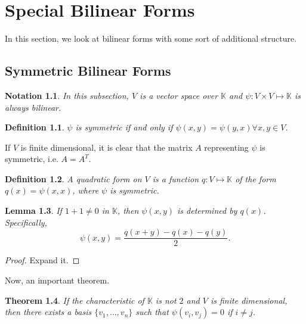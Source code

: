 \documentclass{notes}
\theoremstyle{plain}
\newtheorem{theorem}{Theorem}[chapter]
\newtheorem{definition}[theorem]{Definition}
\newtheorem{lemma}[theorem]{Lemma}
\newtheorem*{notation}{Notation}
\begin{document}
\chapter{Special Bilinear Forms}

In this section, we look at bilinear forms with some sort of
additional structure.

\section{Symmetric Bilinear Forms}

\begin{notation}
  In this subsection, $V$ is a vector space over $\mathbb{K}$ and
  $\psi : V \times V \mapsto \mathbb{K}$ is always bilinear.
\end{notation}

\begin{definition}
  $\psi$ is symmetric if and only if $\psi(x,y) = \psi(y,x) \forall
  x,y \in V$.
\end{definition}

If $V$ is finite dimensional, it is clear that the matrix $A$
representing $\psi$ is symmetric, i.e. $A=A^T$.

\begin{definition}
  A quadratic form on $V$ is a function $q : V \mapsto \mathbb{K}$ of
  the form $q(x)=\psi(x,x)$, where $\psi$ is symmetric.
\end{definition}

\begin{lemma}
  If $1+1 \ne 0$ in $\mathbb{K}$, then $\psi(x,y)$ is determined by
  $q(x)$.  Specifically,
\[
\psi(x,y) = \frac{q(x+y)-q(x)-q(y)}{2}.
\]
\end{lemma}

\begin{proof}
  Expand it.
\end{proof}

Now, an important theorem.

\begin{theorem}
  If the characteristic of $\mathbb{K}$ is not $2$ and $V$ is finite
  dimensional, then there exists a basis $\{v_1,\dots,v_n\}$ such that
  $\psi(v_i,v_j)=0$ if $i \neq j$.
\end{theorem}
\end{document}
